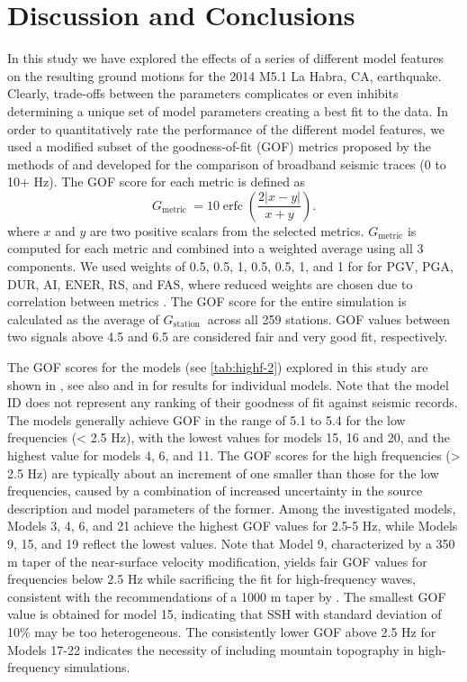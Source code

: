 \section{Discussion and Conclusions}
In this study we have explored the effects of a series of different model features on the resulting ground motions for the 2014 M5.1 La Habra, CA, earthquake. Clearly, trade-offs between the parameters complicates or even inhibits determining a unique set of model parameters creating a best fit to the data. 
In order to quantitatively rate the performance of the different model features, we used a modified subset of the goodness-of-fit (GOF) metrics proposed by the methods of \citet{andersonQuantitativeMeasureGoodnessOfFit2004} and \citet{olsenGoodnessoffitCriteriaBroadband2010} developed for the comparison of broadband seismic traces (0 to 10+ Hz).
The GOF score for each metric is defined as
\begin{equation}\label{qe:highf-4}
  G_{\text {metric }}=10 \operatorname{erfc}\left(\dfrac{2|x-y|}{x+y}\right).
\end{equation}
\noindent where $x$ and $y$ are two positive scalars from the selected metrics. $G_{\text {metric}}$ is computed for each metric and combined into a weighted average using all 3 components. We used weights of 0.5, 0.5, 1, 0.5, 0.5, 1, and 1 for for PGV, PGA, DUR, AI, ENER, RS, and FAS, where reduced weights are chosen due to correlation between metrics \citep{olsenGoodnessoffitCriteriaBroadband2010}. The GOF score for the entire simulation is calculated as the average of $G_{\text {station }}$ across all 259 stations. GOF values between two signals above 4.5 and 6.5 are considered fair and very good fit, respectively.

The GOF scores for the models (see \cref{tab:highf-2}) explored in this study are shown in , see also  and  in  for results for individual models. 
Note that the model ID does not represent any ranking of their goodness of fit against seismic records. The models generally achieve GOF in the range of 5.1 to 5.4 for the low frequencies (< 2.5 Hz), with the lowest values for models 15, 16 and 20, and the highest value for models 4, 6, and 11. The GOF scores for the high frequencies (> 2.5 Hz) are typically about an increment of one smaller than those for the low frequencies, caused by a combination of increased uncertainty in the source description and model parameters of the former. Among the investigated models, Models 3, 4, 6, and 21 achieve the highest GOF values for 2.5-5 Hz, while Models 9, 15, and 19 reflect the lowest values. Note that Model 9, characterized by a 350 m taper of the near-surface velocity modification, yields fair GOF values for frequencies below 2.5 Hz while sacrificing the fit for high-frequency waves, consistent with the recommendations of a 1000 m taper by \citet{huCalibrationNearsurfaceSeismic2021}. The smallest GOF value is obtained for model 15, indicating that SSH with standard deviation of 10\% may be too heterogeneous. The consistently lower GOF above 2.5 Hz for Models 17-22 indicates the necessity of including mountain topography in high-frequency simulations.


